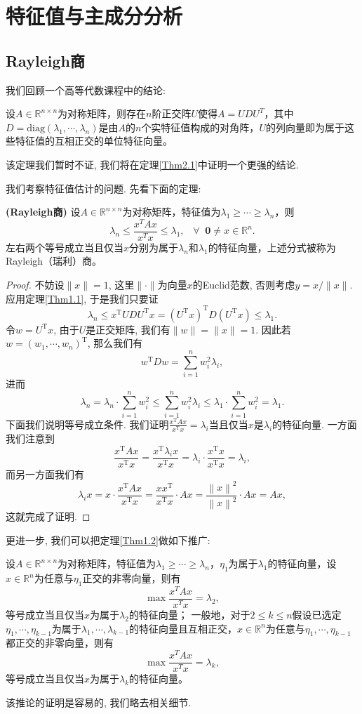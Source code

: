 \section{特征值与主成分分析}
\subsection{Rayleigh商}
我们回顾一个高等代数课程中的结论: 
\begin{theorem}\label{Thm1.1}
设$A\in \mathbb R^{n\times n}$为对称矩阵，则存在$n$阶正交阵$U$使得$A=UDU^T$，其中$D=\mathrm{diag}(\lambda_1,\cdots,\lambda_n)$是由$A$的$n$个实特征值构成的对角阵，$U$的列向量即为属于这些特征值的互相正交的单位特征向量。
\end{theorem}
该定理我们暂时不证, 我们将在定理\ref{Thm2.1}中证明一个更强的结论.\par
我们考察特征值估计的问题. 先看下面的定理:
\begin{theorem}{\textbf{(Rayleigh商)}}\label{Thm1.2}
设$A\in \mathbb R^{n\times n}$为对称矩阵，特征值为$\lambda_1\geq \cdots \geq \lambda_n$，则
$$\lambda_n \leq \frac{x^TAx}{x^Tx} \leq\lambda_1,\;\;\;\forall \;\;\mathbf 0 \neq x\in \mathbb R^n.$$
左右两个等号成立当且仅当$x$分别为属于$\lambda_n$和$\lambda_1$的特征向量，上述分式被称为Rayleigh（瑞利）商。
\end{theorem}
\begin{proof}
不妨设$\|x\|=1$, 这里$\|\cdot\|$为向量$x$的Euclid范数, 否则考虑$y=x/\|x\|$. 应用定理\ref{Thm1.1}, 于是我们只要证
$$
\lambda _n\le x^{\mathrm{T}}UDU^{\mathrm{T}}x=\left( U^{\mathrm{T}}x \right) ^{\mathrm{T}}D\left( U^{\mathrm{T}}x \right) \le \lambda _1.
$$
令$w=U^{\mathrm{T}}x$, 由于$U$是正交矩阵, 我们有$\|w\|=\|x\|=1$. 因此若$w=(w_1,\cdots,w_n)^\mathrm{T}$, 那么我们有
$$
w^{\mathrm{T}}Dw=\sum_{i=1}^n{w_{i}^{2}\lambda _i},
$$
进而
$$
\lambda _n=\lambda _n\cdot \sum_{i=1}^n{w_{i}^{2}}\le \sum_{i=1}^n{w_{i}^{2}\lambda _i}\le \lambda _1\cdot \sum_{i=1}^n{w_{i}^{2}}=\lambda _1.
$$
下面我们说明等号成立条件. 我们证明$\frac{x^\mathrm{T}Ax}{x^\mathrm{T}x}=\lambda_i$当且仅当$x$是$\lambda_i$的特征向量. 一方面我们注意到
$$
\frac{x^{\mathrm{T}}Ax}{x^{\mathrm{T}}x}=\frac{x^{\mathrm{T}}\lambda _ix}{x^{\mathrm{T}}x}=\lambda _i\cdot \frac{x^{\mathrm{T}}x}{x^{\mathrm{T}}x}=\lambda _i,
$$
而另一方面我们有
$$
\lambda _ix=x\cdot \frac{x^{\mathrm{T}}Ax}{x^{\mathrm{T}}x}=\frac{xx^{\mathrm{T}}}{x^{\mathrm{T}}x}\cdot Ax=\frac{\left\| x \right\| ^2}{\left\| x \right\| ^2}\cdot Ax=Ax,
$$
这就完成了证明.
\end{proof}
更进一步, 我们可以把定理\ref{Thm1.2}做如下推广: 
\begin{corollary}
设$A\in \mathbb R^{n\times n}$为对称矩阵，特征值为$\lambda_1\geq \cdots \geq \lambda_n$，$\eta_1$为属于$\lambda_1$的特征向量，设$x \in \mathbb R^n$为任意与$\eta_1$正交的非零向量，则有
$$\max \frac{x^TAx}{x^Tx}=\lambda_2,$$
等号成立当且仅当$x$为属于$\lambda_2$的特征向量； 一般地，对于$2\leq k \leq n$假设已选定$\eta_1,\cdots,\eta_{k-1}$为属于$\lambda_1,\cdots,\lambda_{k-1}$的特征向量且互相正交，$x \in \mathbb R^n$为任意与$\eta_1,\cdots,\eta_{k-1}$都正交的非零向量，则有 
$$\max \frac{x^TAx}{x^Tx}=\lambda_k,$$
等号成立当且仅当$x$为属于$\lambda_k$的特征向量。
\end{corollary}
该推论的证明是容易的, 我们略去相关细节.\par
